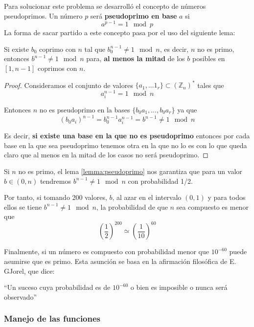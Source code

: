 \documentclass[nochap]{apuntesURJC}
\begin{document}
Para solucionar este problema se desarrolló el concepto de números pseudoprimos. Un número $p$ será \textbf{pseudoprimo en base} $a$ si
\[a^{p-1}=1 \mod p\]
La forma de sacar partido a este concepto pasa por el uso del siguiente lema:
\begin{lemma}\label{lemma:pseudoprimo}
Si existe $b_0$ coprimo con $n$ tal que $b_0^{n-1}\neq 1 \mod n$, es decir, $n$ no es primo, entonces $b^{n-1} \neq 1 \mod n$ para, \textbf{al menos la mitad} de los $b$ posibles en $[1,n-1]$ coprimos con $n$.
\end{lemma}
\begin{proof}
Consideramos el conjunto de valores $\{a_1,...1_r\} \subset \left(\mathbb{Z}_n\right)^*$ tales que
\[a_i^{n-1} = 1 \mod n\]

Entonces $n$ no es pseudoprimo en la bases $\{b_0a_1,...,b_0a_r\}$ ya que
\[(b_0a_i)^{n-1} = b_0^{n-1}a_i^{n-1} = b^{n-1} \neq 1 \mod n\]

Es decir, \textbf{si existe una base en la que no es pseudoprimo} entonces por cada base en la que sea pseudoprimo tenemos otra en la que no lo es con lo que queda claro que al menos en la mitad de los casos no será pseudoprimo.
\end{proof}

Si $n$ no es primo, el lema \ref{lemma:pseudoprimo} nos garantiza que para un valor $b \in (0,n)$ tendremos $b^{n-1}\neq 1 \mod n$ con probabilidad 1/2.

Por tanto, si tomando 200 valores, $b$, al azar en el intervalo $(0,1)$ y para todos ellos se tiene $b^{n-1}\neq 1 \mod n$, la probabilidad de que $n$ sea compuesto es menor que
\[\left( \frac{1}{2} \right)^{200} \simeq \left( \frac{1}{10}\right) ^{60}\]

Finalmente, si un número es compuesto con probabilidad menor que $10^{-60}$ puede asumirse que es primo. Esta asunción se basa en la afirmación filosófica de E. GJorel, que dice:
\begin{center}
``Un suceso cuya probabilidad es de $10^{-60}$ o bien es imposible o nunca será observado''
\end{center}

\subsubsection{Manejo de las funciones}
\end{document}
